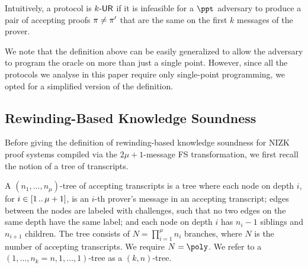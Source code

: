 Intuitively, a protocol is ${k\text{-}\mathsf{UR}}$ if it is infeasible for a $\ppt$ adversary to produce a pair of accepting proofs $\pi \neq \pi'$ that are the same on the first $k$ messages of the prover.  

We note that the definition above can be easily generalized to allow the adversary to program the oracle on more than just a single point. However, since all the protocols we analyse in this paper require only single-point programming, we opted for a simplified version of the definition.
  

\subsection{Rewinding-Based Knowledge Soundness}

Before giving the definition of rewinding-based knowledge soundness for NIZK proof systems compiled via the $2\mu + 1$-message FS transformation, we first recall the notion of a tree of transcripts.
\begin{definition}
	\label{def:tree_of_accepting_transcripts}
	A $(n_1,
  \ldots, n_\mu)$-tree of accepting transcripts is a tree where each node on
  depth $i$, for $i \in [1 \, .. \, \mu + 1]$, is an $i$-th prover's message in an
  accepting transcript; edges between the nodes are labeled with
  challenges, such that no two edges on the same depth have the same
  label; and each node on depth $i$ has $n_{i} - 1$ siblings and $n_{i +
    1}$ children. The tree consists of $N = \prod_{i = 1}^\mu n_i$
  branches, where $N$ is the number of accepting transcripts. We require $N = \poly$. We refer to a $(1, \ldots, n_k=n, 1, \ldots, 1)$-tree as a $(k,n)$-tree.
\end{definition}

\iffalse
		
